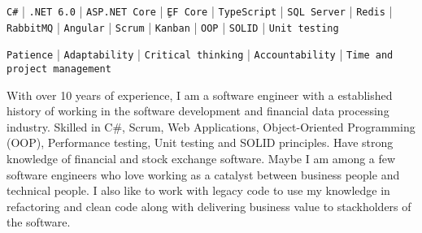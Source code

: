 \documentclass[9pt]{developercv} %
\begin{document}
\vspace{0.0cm}




\begin{minipage}[t]{1\textwidth} %
	\vspace{-\baselineskip} %
\texttt{C\#} | \texttt{.NET 6.0} | \texttt{ASP.NET Core} | \texttt{ٍEF Core} | \texttt{TypeScript} | \texttt{SQL Server} | \texttt{Redis} | \texttt{RabbitMQ} | \texttt{Angular} | \texttt{Scrum} | \texttt{Kanban} | \texttt{OOP} | \texttt{SOLID} | \texttt{Unit testing}
\end{minipage}


\begin{minipage}[t]{1\textwidth} %
	\vspace{-\baselineskip} %
\texttt{Patience} | \texttt{Adaptability} | \texttt{Critical thinking} | \texttt{Accountability} | \texttt{Time and project management}
\end{minipage}



\begin{minipage}[t]{1\textwidth} %
	\vspace{-\baselineskip} %
	
With over 10 years of experience, I am a software engineer with a established history of working in the software development and financial data processing industry. Skilled in C\#, Scrum, Web Applications, Object-Oriented Programming (OOP), Performance testing, Unit testing and SOLID principles. Have strong knowledge of financial and stock exchange software. Maybe I am among a few software engineers who love working as a catalyst between business people and technical people. I also like to work with legacy code to use my knowledge in refactoring and clean code along with delivering business value to stackholders of the software.
\end{minipage}
\end{document}
